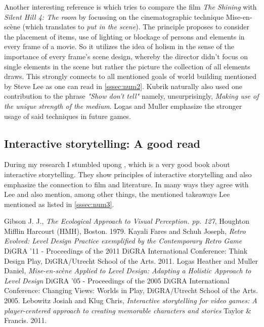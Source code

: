 \documentclass[a4paper]{article}
\begin{document}
Another interesting reference is \cite{logasmuller05} which tries to compare the film \textit{The Shining} with \textit{Silent Hill 4: The room} by focussing on the cinematographic technique Mise-en-scène (which translates to \textit{put in the scene}). The principle proposes to consider the placement of items, use of lighting or blockage of persons and elements in every frame of a movie. So it utilizes the idea of holism in the sense of the importance of every frame's scene design, whereby the director didn't focus on single elements in the scene but rather the picture the collection of all elements draws. This strongly connects to all mentioned goals of world building mentioned by Steve Lee as one can read in \ref{sssec:num2}. Kubrik naturally also used one contribution to the phrase \textit{"Show don't tell"} namely, unsurprisingly, \textit{Making use of the unique strength of the medium}. Logas and Muller emphasize the stronger usage of said techniques in future games.

\subsection{Interactive storytelling: A good read}
During my research I stumbled upong \cite{lebowitzklug11}, which is a very good book about interactive storytelling. They show principles of interactive storytelling and also emphasize the connection to film and literature. In many ways they agree with Lee and also mention, among other things, the mentioned takeaways Lee mentioned as listed in \ref{sssec:num3}.

\renewcommand{\refname}{\section{References and Further Sources}}
\begin{thebibliography}{1}

  Gibson J. J.,
  \emph{The Ecological Approach to Visual Perception. pp. 127},
  Houghton Mifflin Harcourt (HMH), Boston.
  1979.
  Kayali Fares and Schuh Joseph,
  \emph{Retro Evolved: Level Design Practice exemplified by the Contemporary Retro Game}
  DiGRA '11 - Proceedings of the 2011 DiGRA International Conference: Think Design Play, DiGRA/Utrecht School of the Arts.
  2011.
  Logas Heather and Muller Daniel,
  \emph{Mise-en-scène Applied to Level Design: Adapting a Holistic Approach to Level Design}
  DiGRA '05 - Proceedings of the 2005 DiGRA International Conference: Changing Views: Worlds in Play, DiGRA/Utrecht School of the Arts.
  2005.
  Lebowitz Josiah and Klug Chris,
  \emph{Interactive storytelling for video games: A player-centered approach to creating memorable characters and stories}
  Taylor \& Francis.
  2011.
  

\end{thebibliography}
\end{document}
